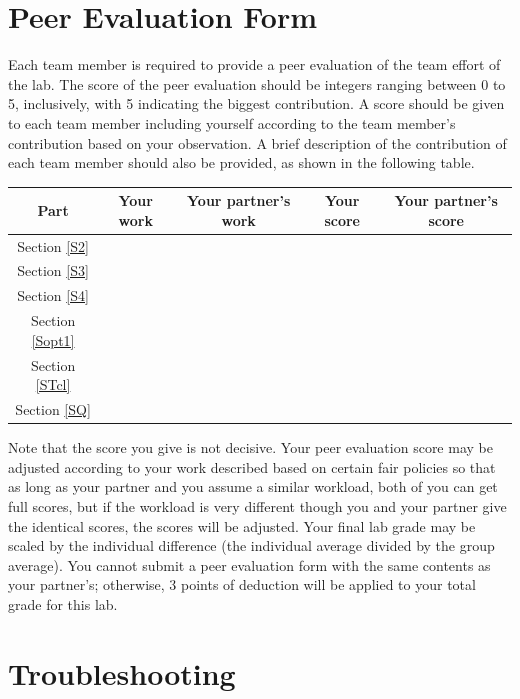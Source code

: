 \documentclass[a4paper,12pt,twoside]{article}
\begin{document}
\section{Peer Evaluation Form}
Each team member is required to provide a peer evaluation of the team effort of the lab. The score of the peer evaluation should be integers ranging between 0 to 5, inclusively, with 5 indicating the biggest contribution. A score should be given to each team member including yourself according to the team member’s contribution based on your observation. A brief
description of the contribution of each team member should also be provided, as shown in the following table.
\begin{table}[H]
    \centering
    \begin{tabular}{|c|c|c|c|c|}
        \hline
        Part & Your work & Your partner's work & Your score & Your partner's score \\
        \hline
        Section \ref{S2} & & & & \\
        \hline
        Section \ref{S3} & & & & \\
        \hline
        Section \ref{S4} & & & & \\
        \hline
        Section \ref{Sopt1} & & & & \\
        \hline
        Section \ref{STcl} & & & & \\
        \hline
        Section \ref{SQ} & & & & \\
        \hline
    \end{tabular}
\end{table}
Note that the score you give is not decisive. Your peer evaluation score may be adjusted according to your work described based on certain fair policies so that as long as your partner and you assume a similar workload, both of you can get full scores, but if the workload is very different though you and your partner give the identical scores, the scores will be adjusted. Your final lab grade may be scaled by the individual difference (the individual average divided by the group average). You cannot submit a peer evaluation form with the same contents as your partner's; otherwise, 3 points of deduction will be applied to your total grade for this lab.

\newpage
\section{Troubleshooting}
\end{document}

